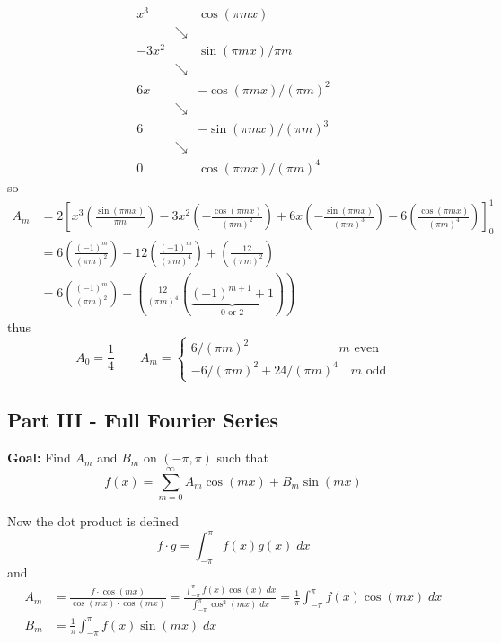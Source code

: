 \documentclass[12pt]{article}
\begin{document}
\[\begin{array}{ccc}
    x^3 & & \cos(\pi mx)\\
        & \searrow & \\
    -3x^2 & & \sin(\pi mx)/\pi m \\
        & \searrow & \\
    6x & & -\cos(\pi mx)/(\pi m)^2\\
        & \searrow & \\
    6 & & -\sin(\pi mx)/(\pi m)^3\\
        & \searrow & \\
    0 & & \cos(\pi mx)/(\pi m)^4
\end{array}\]
so 
\begin{align*}
    A_m &= 2\left[x^3\left(\frac{\sin(\pi mx)}{\pi m}\right) - 3x^2\left(-\frac{\cos(\pi mx)}{(\pi m)^2}\right) + 6x\left(-\frac{\sin(\pi mx)}{(\pi m)^3}\right) - 6\left(\frac{\cos(\pi mx)}{(\pi m)^4}\right)\right]_0^1\\
    &= 6 \left(\frac{(-1)^m}{(\pi m)^2}\right) - 12\left(\frac{(-1)^m}{(\pi m)^4}\right) + \left(\frac{12}{(\pi m)^2}\right)\\
    &= 6 \left(\frac{(-1)^m}{(\pi m)^2}\right) + \left(\frac{12}{(\pi m)^4}(\underbrace{(-1)^{m + 1} + 1}_{0 \text{ or } 2})\right)
\end{align*}
thus 
\[A_0 = \frac{1}{4} \qquad A_m = \begin{cases}
    6/(\pi m)^2 \qquad \qquad \qquad \quad \, m \text{ even}\\
    -6/(\pi m)^2 + 24/(\pi m)^4 \quad m \text{ odd}
\end{cases}\]

\subsection*{Part III - Full Fourier Series}
\textbf{Goal:} Find $A_m$ and $B_m$ on $(-\pi, \pi)$ such that 
\[f(x) = \sum_{m=0}^\infty A_m\cos(mx) + B_m\sin(mx)\]

Now the dot product is defined 
\[f \cdot g = \int_{-\pi}^\pi f(x) g(x)\; dx\]
and 
\begin{align*}
    A_m &= \frac{f \cdot \cos(mx)}{\cos(mx) \cdot \cos(mx)} = \frac{\int_{-\pi}^\pi f(x)\cos(x)\; dx}{\int_{-\pi}^\pi \cos^2 (mx)\;dx} = \frac{1}{\pi} \int_{-\pi}^\pi f(x) \cos(mx)\; dx\\
    B_m &= \frac{1}{\pi} \int_{-\pi}^\pi f(x) \sin(mx)\; dx
\end{align*}
\end{document}
